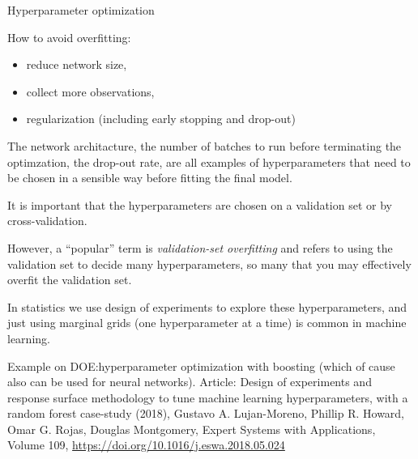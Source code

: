 \documentclass[10pt,ignorenonframetext,]{beamer}
\providecommand{\tightlist}{%
  \setlength{\itemsep}{0pt}\setlength{\parskip}{0pt}}
\begin{document}
\begin{frame}

\begin{block}{Hyperparameter optimization}

How to avoid overfitting:

\begin{itemize}
\tightlist
\item
  reduce network size,
\item
  collect more observations,
\item
  regularization (including early stopping and drop-out)
\end{itemize}

The network architacture, the number of batches to run before
terminating the optimzation, the drop-out rate, are all examples of
hyperparameters that need to be chosen in a sensible way before fitting
the final model.

It is important that the hyperparameters are chosen on a validation set
or by cross-validation.

However, a ``popular'' term is \emph{validation-set overfitting} and
refers to using the validation set to decide many hyperparameters, so
many that you may effectively overfit the validation set.

\end{block}

\end{frame}

\begin{frame}

In statistics we use design of experiments to explore these
hyperparameters, and just using marginal grids (one hyperparameter at a
time) is common in machine learning.

Example on DOE:hyperparameter optimization with boosting (which of cause
also can be used for neural networks). Article: Design of experiments
and response surface methodology to tune machine learning
hyperparameters, with a random forest case-study (2018), Gustavo A.
Lujan-Moreno, Phillip R. Howard, Omar G. Rojas, Douglas Montgomery,
Expert Systems with Applications, Volume 109,
\url{https://doi.org/10.1016/j.eswa.2018.05.024}

\end{frame}
\end{document}
